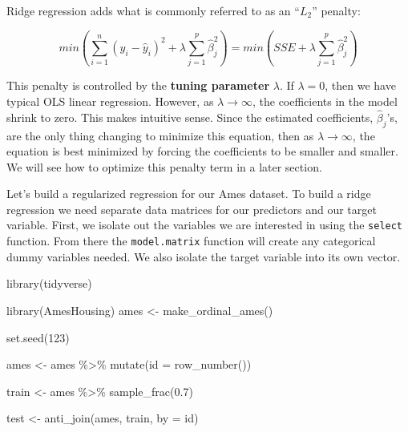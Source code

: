\documentclass[
  letterpaper,
  DIV=11,
  numbers=noendperiod]{scrreprt}
\newenvironment{Shaded}{\begin{snugshade}}{\end{snugshade}}
\newcommand{\AttributeTok}[1]{\textcolor[rgb]{0.40,0.45,0.13}{#1}}
\newcommand{\DecValTok}[1]{\textcolor[rgb]{0.68,0.00,0.00}{#1}}
\newcommand{\FloatTok}[1]{\textcolor[rgb]{0.68,0.00,0.00}{#1}}
\newcommand{\FunctionTok}[1]{\textcolor[rgb]{0.28,0.35,0.67}{#1}}
\newcommand{\NormalTok}[1]{\textcolor[rgb]{0.00,0.23,0.31}{#1}}
\newcommand{\OtherTok}[1]{\textcolor[rgb]{0.00,0.23,0.31}{#1}}
\newcommand{\SpecialCharTok}[1]{\textcolor[rgb]{0.37,0.37,0.37}{#1}}
\newcommand{\StringTok}[1]{\textcolor[rgb]{0.13,0.47,0.30}{#1}}
\begin{document}
Ridge regression adds what is commonly referred to as an ``\(L_2\)''
penalty:

\[
min(\sum_{i=1}^n(y_i - \hat{y}_i)^2 + \lambda \sum_{j=1}^p \hat{\beta}^2_j) = min(SSE + \lambda \sum_{j=1}^p \hat{\beta}^2_j)
\]

This penalty is controlled by the \textbf{tuning parameter} \(\lambda\).
If \(\lambda = 0\), then we have typical OLS linear regression. However,
as \(\lambda \rightarrow \infty\), the coefficients in the model shrink
to zero. This makes intuitive sense. Since the estimated coefficients,
\(\hat{\beta}_j\)'s, are the only thing changing to minimize this
equation, then as \(\lambda \rightarrow \infty\), the equation is best
minimized by forcing the coefficients to be smaller and smaller. We will
see how to optimize this penalty term in a later section.

Let's build a regularized regression for our Ames dataset. To build a
ridge regression we need separate data matrices for our predictors and
our target variable. First, we isolate out the variables we are
interested in using the \texttt{select} function. From there the
\texttt{model.matrix} function will create any categorical dummy
variables needed. We also isolate the target variable into its own
vector.

\begin{Shaded}
\begin{Highlighting}[]
\FunctionTok{library}\NormalTok{(tidyverse)}

\FunctionTok{library}\NormalTok{(AmesHousing)}
\NormalTok{ames }\OtherTok{\textless{}{-}} \FunctionTok{make\_ordinal\_ames}\NormalTok{()}

\FunctionTok{set.seed}\NormalTok{(}\DecValTok{123}\NormalTok{)}

\NormalTok{ames }\OtherTok{\textless{}{-}}\NormalTok{ ames }\SpecialCharTok{\%\textgreater{}\%} \FunctionTok{mutate}\NormalTok{(}\AttributeTok{id =} \FunctionTok{row\_number}\NormalTok{())}

\NormalTok{train }\OtherTok{\textless{}{-}}\NormalTok{ ames }\SpecialCharTok{\%\textgreater{}\%} \FunctionTok{sample\_frac}\NormalTok{(}\FloatTok{0.7}\NormalTok{)}

\NormalTok{test }\OtherTok{\textless{}{-}} \FunctionTok{anti\_join}\NormalTok{(ames, train, }\AttributeTok{by =} \StringTok{\textquotesingle{}id\textquotesingle{}}\NormalTok{)}
\end{Highlighting}
\end{Shaded}
\end{document}

